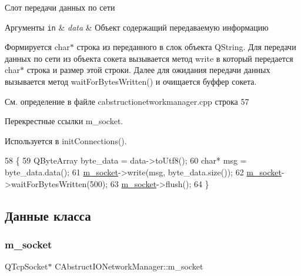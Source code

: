 Слот передачи данных по сети 


\begin{DoxyParams}[1]{Аргументы}
\mbox{\tt in}  & {\em data} & Объект содержащий передаваемую информацию\\
\hline
\end{DoxyParams}
Формируется char$\ast$ строка из переданного в слок объекта Q\+String. Для передачи данных по сети из объекта сокета вызывается метод write в который передается char$\ast$ строка и размер этой строки. Далее для ожидания передачи данных вызывается метод wait\+For\+Bytes\+Written() и очищается буффер сокета. 

См. определение в файле cabstructionetworkmanager.\+cpp строка 57



Перекрестные ссылки m\+\_\+socket.



Используется в init\+Connections().


\begin{DoxyCode}
58 \{
59     QByteArray byte\_data = data->toUtf8();
60     \textcolor{keywordtype}{char}* msg = byte\_data.data();
61     \hyperlink{class_c_abstruct_i_o_network_manager_a0c8754d8191c83c660f43b8c89e39d4e}{m\_socket}->write(msg, byte\_data.size());
62     \hyperlink{class_c_abstruct_i_o_network_manager_a0c8754d8191c83c660f43b8c89e39d4e}{m\_socket}->waitForBytesWritten(500);
63     \hyperlink{class_c_abstruct_i_o_network_manager_a0c8754d8191c83c660f43b8c89e39d4e}{m\_socket}->flush();
64 \}
\end{DoxyCode}


\subsection{Данные класса}
\hypertarget{class_c_abstruct_i_o_network_manager_a0c8754d8191c83c660f43b8c89e39d4e}{}\label{class_c_abstruct_i_o_network_manager_a0c8754d8191c83c660f43b8c89e39d4e} 
\subsubsection{\texorpdfstring{m\+\_\+socket}{m\_socket}}
{\footnotesize\ttfamily Q\+Tcp\+Socket$\ast$ C\+Abstruct\+I\+O\+Network\+Manager\+::m\+\_\+socket\hspace{0.3cm}{\ttfamily [private]}}



